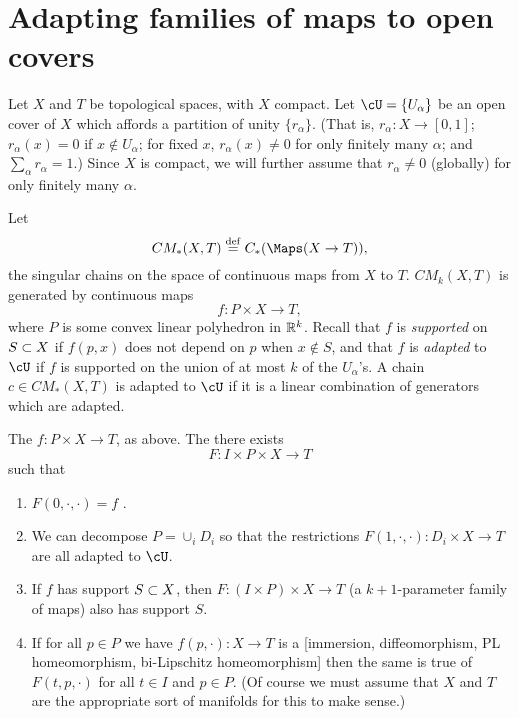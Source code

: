 
\section{Adapting families of maps to open covers}  \label{sec:localising}


Let $X$ and $T$ be topological spaces, with $X$ compact.
Let $\cU = \{U_\alpha\}$ be an open cover of $X$ which affords a partition of
unity $\{r_\alpha\}$.
(That is, $r_\alpha : X \to [0,1]$; $r_\alpha(x) = 0$ if $x\notin U_\alpha$;
for fixed $x$, $r_\alpha(x) \ne 0$ for only finitely many $\alpha$; and $\sum_\alpha r_\alpha = 1$.)
Since $X$ is compact, we will further assume that $r_\alpha \ne 0$ (globally) 
for only finitely
many $\alpha$.

Let
\[
	CM_*(X, T) \deq C_*(\Maps(X\to T)) ,
\]
the singular chains on the space of continuous maps from $X$ to $T$.
$CM_k(X, T)$ is generated by continuous maps
\[
	f: P\times X \to T ,
\]
where $P$ is some convex linear polyhedron in $\mathbb{R}^k$.
Recall that $f$ is {\it supported} on $S\subset X$ if $f(p, x)$ does not depend on $p$ when
$x \notin S$, and that $f$ is {\it adapted} to $\cU$ if 
$f$ is supported on the union of at most $k$ of the $U_\alpha$'s.
A chain $c \in CM_*(X, T)$ is adapted to $\cU$ if it is a linear combination of 
generators which are adapted.

\begin{lemma} \label{basic_adaptation_lemma}
The $f: P\times X \to T$, as above.
The there exists
\[
	F: I \times P\times X \to T
\]
such that
\begin{enumerate}
\item $F(0, \cdot, \cdot) = f$ .
\item We can decompose $P = \cup_i D_i$ so that
the restrictions $F(1, \cdot, \cdot) : D_i\times X\to T$ are all adapted to $\cU$.
\item If $f$ has support $S\subset X$, then
$F: (I\times P)\times X\to T$ (a $k{+}1$-parameter family of maps) also has support $S$.
\item If for all $p\in P$ we have $f(p, \cdot):X\to T$ is a 
[immersion, diffeomorphism, PL homeomorphism, bi-Lipschitz homeomorphism]
then the same is true of $F(t, p, \cdot)$ for all $t\in I$ and $p\in P$.
(Of course we must assume that $X$ and $T$ are the appropriate 
sort of manifolds for this to make sense.)
\end{enumerate}
\end{lemma}

